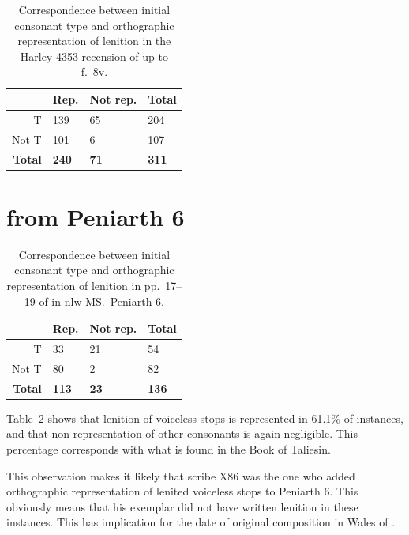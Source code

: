 \begin{table}[h]
\centering
\begin{tabular}{@{}rlll@{}}
\toprule
 & \textbf{Rep.} & \textbf{Not rep.} & \textbf{Total} \\ \midrule
T & 139 & 65 & 204 \\
Not T & 101 & 6 & 107 \\
\textbf{Total} & \textbf{240} & \textbf{71} & \textbf{311} \\ \bottomrule
\end{tabular}
\caption{Correspondence between initial consonant type and orthographic representation of lenition in the Harley 4353  recension of  up to f.\ 8v.}
\label{overviewharley4353}
\end{table}

\section{ from Peniarth 6}

\begin{table}[h]
\centering
\begin{tabular}{@{}rlll@{}}
\toprule
 & \textbf{Rep.} & \textbf{Not rep.} & \textbf{Total} \\ \midrule
T & 33 & 21 & 54 \\
Not T & 80 & 2 & 82 \\
\textbf{Total} & \textbf{113} & \textbf{23} & \textbf{136} \\ \bottomrule
\end{tabular}
\caption{Correspondence between initial consonant type and orthographic representation of lenition in pp.\ 17--19 of  in \gls{nlw} MS.\ Peniarth 6.}
\label{overviewgeraint}
\end{table}

Table~\ref{overviewgeraint} shows that lenition of voiceless stops is represented in 61.1\% of instances, and that non-representation of other consonants is again negligible. This percentage corresponds with what is found in the Book of Taliesin. 

This observation makes it likely that scribe X86 was the one who added orthographic representation of lenited voiceless stops to Peniarth 6. This obviously means that his exemplar did not have written lenition in these instances. This has implication for the date of original composition in Wales of . 



